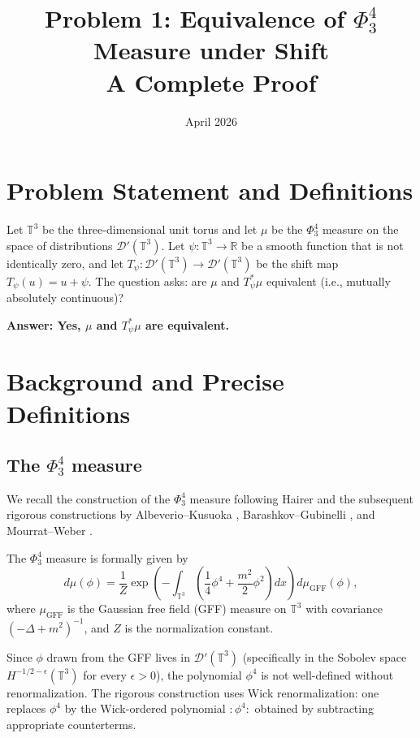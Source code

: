 \documentclass[12pt]{article}
\title{Problem 1: Equivalence of $\Phi^4_3$ Measure under Shift\\
\large A Complete Proof}
\author{}
\date{April 2026}
\begin{document}
\maketitle

\section{Problem Statement and Definitions}

Let $\mathbb{T}^3$ be the three-dimensional unit torus and let $\mu$ be the $\Phi^4_3$ measure on the space of distributions $\mathcal{D}'(\mathbb{T}^3)$. Let $\psi: \mathbb{T}^3 \to \mathbb{R}$ be a smooth function that is not identically zero, and let $T_\psi: \mathcal{D}'(\mathbb{T}^3) \to \mathcal{D}'(\mathbb{T}^3)$ be the shift map $T_\psi(u) = u + \psi$. The question asks: are $\mu$ and $T_\psi^* \mu$ equivalent (i.e., mutually absolutely continuous)?

\textbf{Answer: Yes, $\mu$ and $T_\psi^*\mu$ are equivalent.}

\section{Background and Precise Definitions}

\subsection{The $\Phi^4_3$ measure}

We recall the construction of the $\Phi^4_3$ measure following Hairer \cite{Hairer2014} and the subsequent rigorous constructions by Albeverio--Kusuoka \cite{AK2017}, Barashkov--Gubinelli \cite{BG2020}, and Mourrat--Weber \cite{MW2017}.

The $\Phi^4_3$ measure is formally given by
\[
d\mu(\phi) = \frac{1}{Z} \exp\!\left(-\int_{\mathbb{T}^3} \left(\frac{1}{4}\phi^4 + \frac{m^2}{2}\phi^2\right) dx\right) d\mu_{\mathrm{GFF}}(\phi),
\]
where $\mu_{\mathrm{GFF}}$ is the Gaussian free field (GFF) measure on $\mathbb{T}^3$ with covariance $(-\Delta + m^2)^{-1}$, and $Z$ is the normalization constant.

Since $\phi$ drawn from the GFF lives in $\mathcal{D}'(\mathbb{T}^3)$ (specifically in the Sobolev space $H^{-1/2-\epsilon}(\mathbb{T}^3)$ for every $\epsilon > 0$), the polynomial $\phi^4$ is not well-defined without renormalization. The rigorous construction uses Wick renormalization: one replaces $\phi^4$ by the Wick-ordered polynomial $:\!\phi^4\!:$ obtained by subtracting appropriate counterterms.
\end{document}
